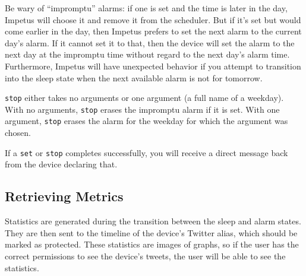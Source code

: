 Be wary of ``impromptu'' alarms: if one is set and the time is later
in the day, Impetus will choose it and remove it from the
scheduler. But if it's set but would come earlier in the day, then
Impetus prefers to set the next alarm to the current day's alarm. If
it cannot set it to that, then the device will set the alarm to the
next day at the impromptu time without regard to the next day's alarm
time. Furthermore, Impetus will have unexpected behavior if you
attempt to transition into the sleep state when the next available
alarm is not for tomorrow.

\verb|stop| either takes no arguments or one argument (a full name of
a weekday). With no arguments, \verb|stop| erases the impromptu alarm
if it is set. With one argument, \verb|stop| erases the alarm for the
weekday for which the argument was chosen.

If a \verb|set| or \verb|stop| completes successfully, you will
receive a direct message back from the device declaring that.

\subsection{Retrieving Metrics}
Statistics are generated during the transition between the sleep and
alarm states. They are then sent to the timeline of the device's
Twitter alias, which should be marked as protected. These statistics
are images of graphs, so if the user has the correct permissions to
see the device's tweets, the user will be able to see the statistics.
